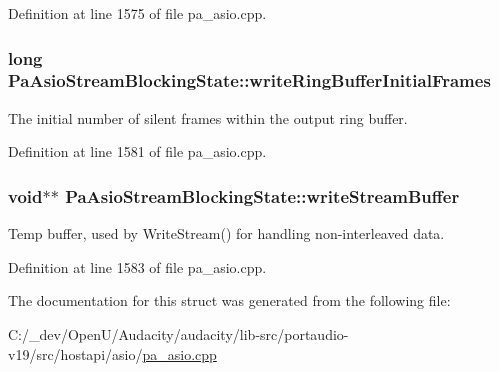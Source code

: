 Definition at line 1575 of file pa\+\_\+asio.\+cpp.

\subsubsection[{\texorpdfstring{write\+Ring\+Buffer\+Initial\+Frames}{writeRingBufferInitialFrames}}]{\setlength{\rightskip}{0pt plus 5cm}long Pa\+Asio\+Stream\+Blocking\+State\+::write\+Ring\+Buffer\+Initial\+Frames}\hypertarget{struct_pa_asio_stream_blocking_state_a3367c2abcf6ecd151b370b80e196a0fe}{}\label{struct_pa_asio_stream_blocking_state_a3367c2abcf6ecd151b370b80e196a0fe}
The initial number of silent frames within the output ring buffer. 

Definition at line 1581 of file pa\+\_\+asio.\+cpp.

\subsubsection[{\texorpdfstring{write\+Stream\+Buffer}{writeStreamBuffer}}]{ {\bf void}$\ast$$\ast$ Pa\+Asio\+Stream\+Blocking\+State\+::write\+Stream\+Buffer}\hypertarget{struct_pa_asio_stream_blocking_state_adbca9a38efb53888c4d0578125058a2e}{}\label{struct_pa_asio_stream_blocking_state_adbca9a38efb53888c4d0578125058a2e}
Temp buffer, used by Write\+Stream() for handling non-\/interleaved data. 

Definition at line 1583 of file pa\+\_\+asio.\+cpp.



The documentation for this struct was generated from the following file\+:\begin{DoxyCompactItemize}
\item 
C\+:/\+\_\+dev/\+Open\+U/\+Audacity/audacity/lib-\/src/portaudio-\/v19/src/hostapi/asio/\hyperlink{pa__asio_8cpp}{pa\+\_\+asio.\+cpp}\end{DoxyCompactItemize}

